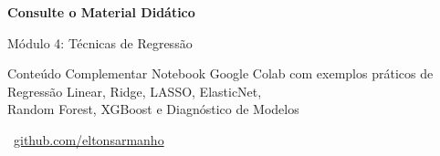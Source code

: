 \documentclass[]{beamer}
\begin{document}
\begin{frame}{}
\centering
\vspace{1em}
{\Large \textcolor{mineblue}{\textbf{Consulte o Material Didático}}}

\vspace{0.8em}
{\large Módulo 4: Técnicas de Regressão}

\vspace{1em}
\begin{block}{\centering Conteúdo Complementar}
\centering
Notebook Google Colab com exemplos práticos de\\
Regressão Linear, Ridge, LASSO, ElasticNet,\\
Random Forest, XGBoost e Diagnóstico de Modelos
\end{block}

\vspace{0.8em}
\small \faGithub \ \href{https://github.com/eltonsarmanho}{github.com/eltonsarmanho}
\end{frame}
\end{document}
